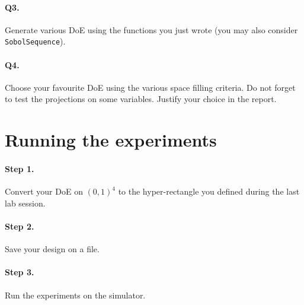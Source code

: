 \documentclass[12pt]{scrartcl}
\begin{document}
\paragraph{Q3.} Generate various DoE using the functions you just wrote (you may also consider \texttt{SobolSequence}). 

\paragraph{Q4.} Choose your favourite DoE using the various space filling criteria. Do not forget to test the projections on some variables. Justify your choice in the report. 

\section{Running the experiments}

\paragraph{Step 1.} Convert your DoE on $(0,1)^4$ to the hyper-rectangle you defined during the last lab session.

\paragraph{Step 2.} Save your design on a file.

\paragraph{Step 3.} Run the experiments on the simulator.
\end{document}
